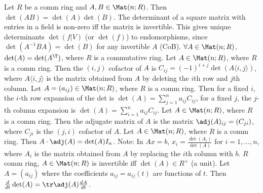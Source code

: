 Let $R$ be a comm ring and $A, B \in \Mat(n; R)$.
Then $\det(AB) = \det(A) \det(B)$.
The determinant of a square matrix with entries in a field is non-zero iff the matrix is invertible.
This gives unique determinants $\det(f|V)$ (or $\det(f)$) to endomorphisms, since $\det(A^{-1}BA) = \det(B)$
for any invertible $A$ (CoB).
 $\forall A \in \Mat(n; R)$, $\det(A) = \det(A^\T)$, where $R$ is a commutative ring.
Let $A \in \Mat(n; R)$, where $R$ is a comm ring.
Then the $(i, j)$ cofactor of $A$ is $C_{ij} = (-1)^{i+j} \det(A \langle i, j \rangle)$,
where $A \langle i, j \rangle$ is the matrix obtained from $A$ by deleting the $i$th row and $j$th column.
Let $A = (a_{ij}) \in \Mat(n; R)$, where $R$ is a comm ring.
Then for a fixed $i$, the $i$-th row expansion of the det is
$\det(A) = \sum_{j = 1}^n a_{ij} C_{ij}$,
for a fixed $j$, the $j$-th column expansion is
$\det(A) = \sum_{i = 1}^n a_{ij} C_{ij}$.
Let $A \in \Mat(n; R)$, where $R$ is a comm ring.
Then the adjugate matrix of $A$ is the matrix $\adj(A)_{ij} = (C_{ji})$,
where $C_{ji}$ is the $(j, i)$ cofactor of $A$.
Let $A \in \Mat(n; R)$, where $R$ is a comm ring.
Then $A \cdot \adj(A) = \det(A) I_n$.
Note: In $Ax = b$, $x_i = \frac{\det(A_i)}{\det(A)}$ for $i = 1, ..., n$,
where $A_i$ is the matrix obtained from $A$ by replacing the $i$th column with $b$.
$R$ comm ring, $A \in \Mat(n; R)$ is invertible iff $\det(A) \in R^\times$ (a unit).
Let $A = (a_{ij})$ where the coefficients $a_{ij} = a_{ij}(t)$ are functions of $t$.
Then $\frac{d}{dt} \det(A) = \tr \adj(A) \frac{d A}{dt}$.

